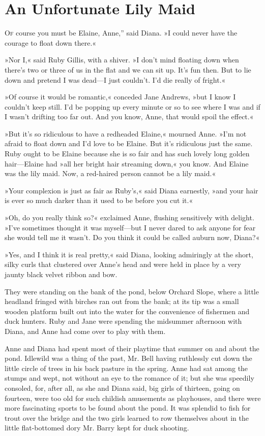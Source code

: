 \chapter{An Unfortunate Lily Maid}

\lettrine[ante=“,lines=4]{O}{f} course you must be Elaine, Anne,” said Diana. »I could never have the courage to float down there.«

»Nor I,« said Ruby Gillis, with a shiver. »I don't mind floating down when there's two or three of us in the flat and we can sit up. It's fun then. But to lie down and pretend I was dead—I just couldn't. I'd die really of fright.«

»Of course it would be romantic,« conceded Jane Andrews, »but I know I couldn't keep still. I'd be popping up every minute or so to see where I was and if I wasn't drifting too far out. And you know, Anne, that would spoil the effect.«

»But it's so ridiculous to have a redheaded Elaine,« mourned Anne. »I'm not afraid to float down and I'd love to be Elaine. But it's ridiculous just the same. Ruby ought to be Elaine because she is so fair and has such lovely long golden hair—Elaine had »all her bright hair streaming down,« you know. And Elaine was the lily maid. Now, a red-haired person cannot be a lily maid.«

»Your complexion is just as fair as Ruby's,« said Diana earnestly, »and your hair is ever so much darker than it used to be before you cut it.«

»Oh, do you really think so?« exclaimed Anne, flushing sensitively with delight. »I've sometimes thought it was myself—but I never dared to ask anyone for fear she would tell me it wasn't. Do you think it could be called auburn now, Diana?«

»Yes, and I think it is real pretty,« said Diana, looking admiringly at the short, silky curls that clustered over Anne's head and were held in place by a very jaunty black velvet ribbon and bow.

They were standing on the bank of the pond, below Orchard Slope, where a little headland fringed with birches ran out from the bank; at its tip was a small wooden platform built out into the water for the convenience of fishermen and duck hunters. Ruby and Jane were spending the midsummer afternoon with Diana, and Anne had come over to play with them.

Anne and Diana had spent most of their playtime that summer on and about the pond. Idlewild was a thing of the past, Mr. Bell having ruthlessly cut down the little circle of trees in his back pasture in the spring. Anne had sat among the stumps and wept, not without an eye to the romance of it; but she was speedily consoled, for, after all, as she and Diana said, big girls of thirteen, going on fourteen, were too old for such childish amusements as playhouses, and there were more fascinating sports to be found about the pond. It was splendid to fish for trout over the bridge and the two girls learned to row themselves about in the little flat-bottomed dory Mr. Barry kept for duck shooting.

